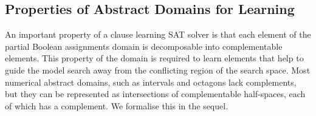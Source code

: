 
%


\subsection{Properties of Abstract Domains for Learning}
%
An important property of a clause learning SAT solver is that each
element of the partial Boolean assignments domain is decomposable into
complementable elements.  This property of the domain is required to
learn elements that help to guide the model search away from the
conflicting region of the search space.
%
Most numerical abstract domains, such as intervals and octagons lack
complements, but they can be represented as intersections of
complementable half-spaces, each of which has a complement. We
formalise this in the sequel.

